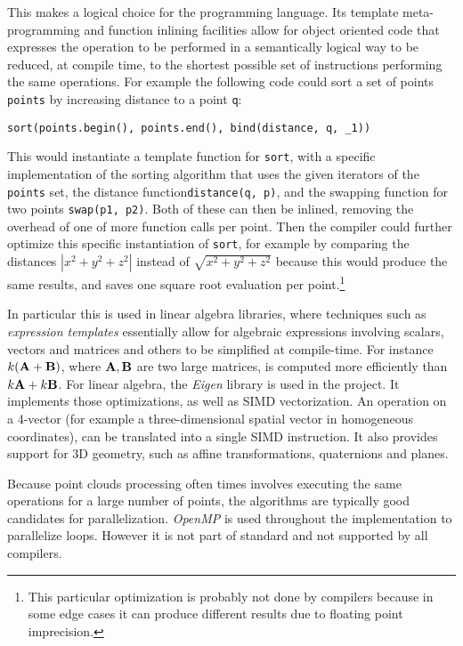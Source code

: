 This makes \cpp{} a logical choice for the programming language. Its template meta-programming and function inlining facilities allow for object oriented code that expresses the operation to be performed in a semantically logical way to be reduced, at compile time, to the shortest possible set of instructions performing the same operations. For example the following code could sort a set of points \texttt{points} by increasing distance to a point \texttt{q}:
\begin{lstlisting}
sort(points.begin(), points.end(), bind(distance, q, _1))
\end{lstlisting}
This would instantiate a template function for \texttt{sort}, with a specific implementation of the sorting algorithm that uses the given iterators of the \texttt{points} set, the distance function\texttt{distance(q, p)}, and the swapping function for two points \texttt{swap(p1, p2)}. Both of these can then be inlined, removing the overhead of one of more function calls per point. Then the compiler could further optimize this specific instantiation of \texttt{sort}, for example by comparing the distances $| x^2 + y^2 + z^2 |$ instead of $\sqrt{x^2 + y^2 + z^2}$ because this would produce the same results, and saves one square root evaluation per point.\footnote{This particular optimization is probably not done by compilers because in some edge cases it can produce different results due to floating point imprecision.} 

In particular this is used in linear algebra libraries, where techniques such as \emph{expression templates} essentially allow for algebraic expressions involving scalars, vectors and matrices and others to be simplified at compile-time. For instance $k (\mathbf{A} + \mathbf{B})$, where $\mathbf{A}, \mathbf{B}$ are two large matrices, is computed more efficiently than $k \mathbf{A} + k \mathbf{B}$. For linear algebra, the \emph{Eigen} library is used in the project. It implements those optimizations, as well as SIMD vectorization. An operation on a 4-vector (for example a three-dimensional spatial vector in homogeneous coordinates), can be translated into a single SIMD instruction. It also provides support for 3D geometry, such as affine transformations, quaternions and planes.

Because point clouds processing often times involves executing the same operations for a large number of points, the algorithms are typically good candidates for parallelization. \emph{OpenMP} is used throughout the implementation to parallelize loops. However it is not part of standard \cpp{} and not supported by all compilers.

